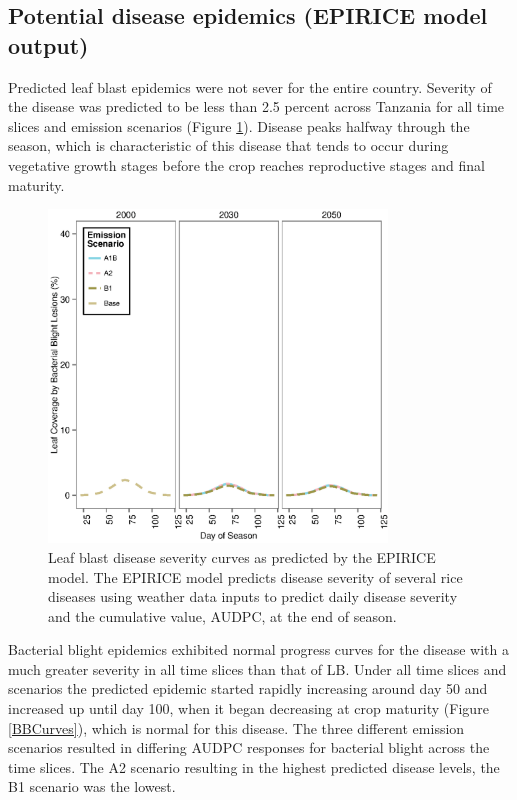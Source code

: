 \documentclass[preprint,review,12pt]{elsarticle}
\begin{document}
    \subsection{Potential disease epidemics (EPIRICE model output)}
    Predicted leaf blast epidemics were not sever for the entire country. Severity of the disease was predicted to be less than 2.5 percent across Tanzania for all time slices and emission scenarios (Figure \ref{LBCurves}). Disease peaks halfway through the season, which is characteristic of this disease that tends to occur during vegetative growth stages before the crop reaches reproductive stages and final maturity.
    
    \begin{figure}[H]
      \includegraphics[width = 90mm]{figures/LB}
      \caption{Leaf blast disease severity curves as predicted by the EPIRICE model. The EPIRICE model predicts disease severity of several rice diseases using weather data inputs to predict daily disease severity and the cumulative value, AUDPC, at the end of season.}
        \label{LBCurves}
    \end{figure}
    
    Bacterial blight epidemics exhibited normal progress curves for the disease with a much greater severity in all time slices than that of LB. Under all time slices and scenarios the predicted epidemic started rapidly increasing around day 50 and increased up until day 100, when it began decreasing at crop maturity (Figure \ref{BBCurves}), which is normal for this disease. The three different emission scenarios resulted in differing AUDPC responses for bacterial blight across the time slices. The A2 scenario resulting in the highest predicted disease levels, the B1 scenario was the lowest.
    
\end{document}
